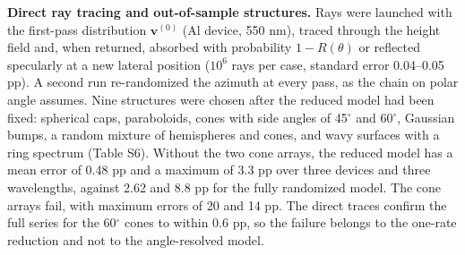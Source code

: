 \documentclass[10pt]{article}
\begin{document}
\textbf{Direct ray tracing and out-of-sample structures.} Rays were launched with the first-pass distribution $\mathbf{v}^{(0)}$ (Al device, 550 nm), traced through the height field and, when returned, absorbed with probability $1-R(\theta)$ or reflected specularly at a new lateral position ($10^6$ rays per case, standard error 0.04–0.05 pp). A second run re-randomized the azimuth at every pass, as the chain on polar angle assumes. Nine structures were chosen after the reduced model had been fixed: spherical caps, paraboloids, cones with side angles of 45\ensuremath{^\circ} and 60\ensuremath{^\circ}, Gaussian bumps, a random mixture of hemispheres and cones, and wavy surfaces with a ring spectrum (Table S6). Without the two cone arrays, the reduced model has a mean error of 0.48 pp and a maximum of 3.3 pp over three devices and three wavelengths, against 2.62 and 8.8 pp for the fully randomized model. The cone arrays fail, with maximum errors of 20 and 14 pp. The direct traces confirm the full series for the 60\ensuremath{^\circ} cones to within 0.6 pp, so the failure belongs to the one-rate reduction and not to the angle-resolved model.
\end{document}
